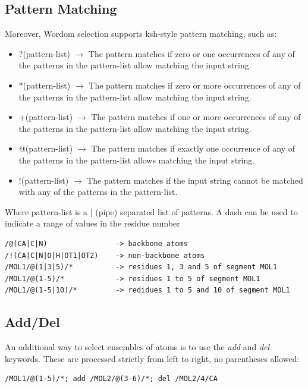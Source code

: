 \documentclass[11pt,twoside,onecolumn,a4paper,openright,notitlepage]{book}[2001/04/21]
\begin{document}
\subsection{Pattern Matching}
Moreover, Wordom selection supports ksh-style pattern matching, such as:
\begin{itemize}
\item ?(pattern-list) $\to$ The pattern matches if zero or one occurrences of any of the patterns in the pattern-list allow matching the input string.
\item *(pattern-list) $\to$ The pattern matches if zero or more occurrences of any of the patterns in the pattern-list allow matching the input string.
\item +(pattern-list) $\to$ The pattern matches if one or more occurrences of any of the patterns in the pattern-list allow matching the input string.
\item @(pattern-list) $\to$ The pattern matches if exactly one occurrence of any of the patterns in the pattern-list allows matching the input string.
\item !(pattern-list) $\to$ The pattern matches if the input string cannot be matched with any of the patterns in the pattern-list. 
\end{itemize}

Where pattern-list is a $|$ (pipe) separated list of patterns. A dash can be used to indicate a range of values in the residue number

\begin{verbatim}
/@(CA|C|N)                -> backbone atoms
/!(CA|C|N|O|H|OT1|OT2)    -> non-backbone atoms
/MOL1/@(1|3|5)/*          -> residues 1, 3 and 5 of segment MOL1
/MOL1/@(1-5)/*            -> residues 1 to 5 of segment MOL1
/MOL1/@(1-5|10)/*         -> redidues 1 to 5 and 10 of segment MOL1
\end{verbatim}

\subsection{Add/Del}
An additional way to select ensembles of atoms is to use the \emph{add} and \emph{del} keywords. These are processed strictly from left to right, no parentheses allowed:

\begin{verbatim}
/MOL1/@(1-5)/*; add /MOL2/@(3-6)/*; del /MOL2/4/CA
\end{verbatim}
\end{document}
